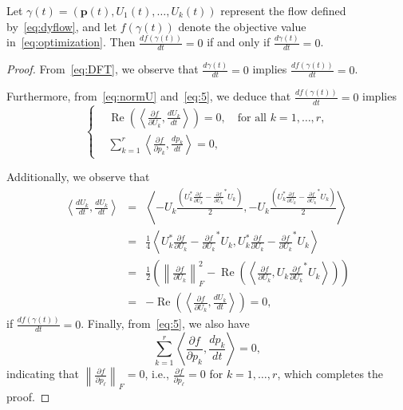 \documentclass[onefignum,onetabnum]{siamart220329}
\begin{document}
    
    \begin{corollary}
    Let $\gamma(t) = (\mathbf{p}(t), U_1(t), \ldots, U_k(t))$ represent the flow defined by~\eqref{eq:dyflow}, and let $f(\gamma(t))$ denote the objective value in~\eqref{eq:optimization}. Then $\frac{df(\gamma(t))}{dt} = 0$ if and only if $\frac{d\gamma(t)}{dt} = 0$.
    \end{corollary}
    \begin{proof}
    From~\eqref{eq:DFT}, we observe that $\frac{d\gamma(t)}{dt} = 0$ implies $\frac{df(\gamma(t))}{dt} = 0$. 
    
    Furthermore, from~\eqref{eq:normU} and~\eqref{eq:5}, we deduce that 
    $\frac{df(\gamma(t))}{dt} = 0$ implies 
    \begin{equation} \label{eq:eq1}
    \left\{
    \begin{aligned}
      & \operatorname{Re}\left(
      \left\langle
    \frac{\partial f}{\partial U_k}, \frac{d U_k}{dt}
      \right\rangle
      \right) = 0, \quad \text{for all } k=1, \ldots, r, \\ 
      &   \sum_{k=1}^r 
      \left\langle
    \frac{\partial f}{\partial p_k}, \frac{d p_k}{dt}
      \right\rangle = 0,
    \end{aligned}
    \right.
    \end{equation}
    
    Additionally, we observe that
    \begin{eqnarray}\label{eq:normdudt}  
    \left\langle \frac{d U_k}{dt},
    \frac{d U_k}{dt}
    \right\rangle            
    &=& 
    \left\langle -
     U_k \frac{\left( U_k^* 
    \frac{\partial f}{\partial U_k} -  
    {\frac{\partial f}{\partial U_k}}^* U_k 
    \right)}{2}, -
     U_k \frac{\left( U_k^* 
    \frac{\partial f}{\partial U_k} -  
    {\frac{\partial f}{\partial U_k}}^* U_k 
    \right)}{2} \right\rangle
    \nonumber\\  
    &=&
    \frac{1}{4}
    \left\langle 
     U_k^*
    \frac{\partial f}{\partial U_k} -  
    {\frac{\partial f}{\partial U_k}}^* U_k, 
    U_k^* 
    \frac{\partial f}{\partial U_k} -  
    {\frac{\partial f}{\partial U_k}}^* U_k 
     \right\rangle \nonumber\\
    &=&
    \frac{1}{2}
    \left(
    \left\|\frac{\partial f}{\partial U_k}
    \right\|_F^2 - \operatorname{Re}\left(\left\langle 
    \frac{\partial f}{\partial U_k}, U_k 
    {\frac{\partial f}{\partial U_k}}^* U_k  
     \right\rangle
    \right)
    \right)
     \nonumber\\ 
     &=& - \operatorname{Re}
     \left(\left\langle 
    \frac{\partial f}{\partial U_k}, 
    \frac{dU_k}{dt}   
     \right\rangle
    \right) = 0,
    \end{eqnarray}
    if $\frac{df(\gamma(t))}{dt} = 0$.
    Finally, from~\eqref{eq:5}, we also have 
    \[
    \sum_{k=1}^r 
      \left\langle
    \frac{\partial f}{\partial p_k}, \frac{d p_k}{dt}
      \right\rangle = 0,
    \]
    indicating that $\left\|\frac{\partial f}{\partial p_\ell}\right\|_F = 0$, i.e., $\frac{\partial f}{\partial p_\ell} = 0$ for $k=1, \ldots, r$, which completes the proof.
    \end{proof}
    
\end{document}
